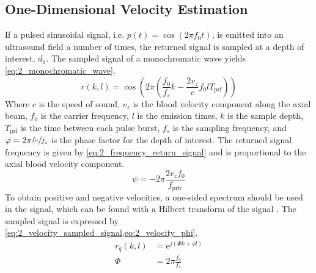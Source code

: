 \subsection{One-Dimensional Velocity Estimation}
If a pulsed sinusoidal signal, i.e. $p(t)= \cos \left( 2\pi f_{0} t \right)$, is emitted into an ultrasound field a number of times, the returned signal is sampled at a depth of interest, $d_{0}$. The sampled signal of a \gls{monochromatic wave} yields \cref{eq:2_monochromatic_wave}.
\begin{equation} \label{eq:2_monochromatic_wave}
	r \left(k, l \right) = \cos \left( 2\pi \left( \frac{f_{0}}{f_{s}} k - \frac{2v_{z}}{c} f_{0} l T_{\mathrm{prf}} \right) \right)
\end{equation}
Where $c$ is the speed of sound, $v_{z}$ is the blood velocity component along the axial beam, $f_{0}$ is the carrier frequency, $l$ is the emission times, $k$ is the sample depth, $T_{\mathrm{prf}}$ is the time between each pulse burst, $f_{s}$ is the sampling frequency, and $\varphi = 2\pi \sfrac{f_{0}}{f_{s}}$ is the phase factor for the depth of interest. The returned signal frequency is given by \cref{eq:2_frequency_return_signal} and is proportional to the axial blood velocity component.
\begin{equation} \label{eq:2_frequency_return_signal}
	\psi = -2\pi \frac{2v_{z}f_{0}}{f_{\mathrm{prf}c}}
\end{equation}
To obtain positive and negative velocities, a one-sided spectrum should be used in the signal, which can be found with a Hilbert transform of the signal \cite{Pirnia_Thesis}. The sampled signal is expressed by \cref{eq:2_velocity_sampled_signal,eq:2_velocity_phi}.
\begin{subequations}
	\begin{align}
		r_{q}(k,l) &= \mathrm{e}^{j \left( \Phi k + \phi l \right)} \label{eq:2_velocity_sampled_signal} \\
		\Phi &= 2\pi \frac{f_{0}}{f_{s}} \label{eq:2_velocity_phi}
	\end{align}
\end{subequations}

